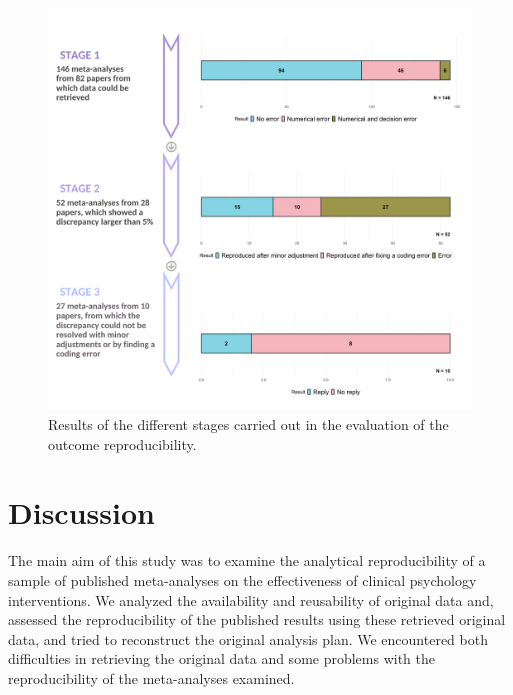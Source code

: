 \documentclass[
  ,jou, a4paper,floatsintext]{apa6}
\begin{document}
\begin{figure}
\begin{center}
\includegraphics[width=\textwidth]{results/Figure 6.png}

\caption{Results of the different stages carried out in the evaluation of the outcome reproducibility. 
}

\label{fig:fig6}
\end{center}
\end{figure}

\hypertarget{discussion}{%
\section{Discussion}\label{discussion}}

The main aim of this study was to examine the analytical reproducibility of a sample of published meta-analyses on the effectiveness of clinical psychology interventions. We analyzed the availability and reusability of original data and, assessed the reproducibility of the published results using these retrieved original data, and tried to reconstruct the original analysis plan. We encountered both difficulties in retrieving the original data and some problems with the reproducibility of the meta-analyses examined.
\end{document}
